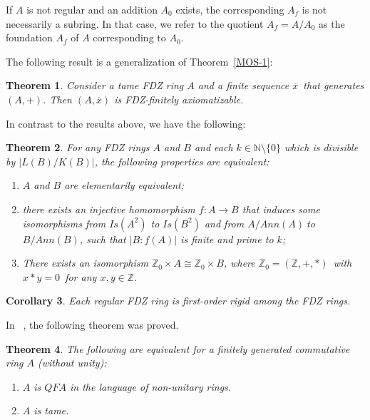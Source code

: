 \documentclass{article}
\newtheorem{theorem}{Theorem}[section]
\newtheorem{cor}[theorem]{Corollary}
\theoremstyle{remark}
\newcommand{\be}{\begin{enumerate}}
\newcommand{\ee}{\end{enumerate}}
\begin{document}
If $A$ is not regular and an addition $A_0$ exists, the corresponding $A_f$ is not necessarily a subring. In that case, we refer to the quotient $A_f=A/A_0$ as the foundation $A_f$ of $A$ corresponding to $A_0$.

The following result is a generalization of Theorem~\ref{MOS-1}:

\begin{theorem}\label{MOS-4} Consider a tame FDZ ring $A$ and a finite
sequence $\overline{x}$\ that generates $(A,+)$. Then $(A,\overline{x})$ is
FDZ-finitely axiomatizable.\end{theorem}

In contrast to the results above, we have the following:

\begin{theorem} For any FDZ rings $A$ and $B$ and each $k\in 
\mathbb{N}\setminus \{0\}
$ which is divisible by $\left| L(B)/K(B)\right| $, the following
properties are equivalent:
\be 
\item $A$ and $B$ are elementarily equivalent;

\item there exists an injective homomorphism $f:A\rightarrow B$ that
induces some isomorphisms from $Is(A^{2})$ to $Is(B^{2})$ and from $%
A/Ann(A)\ $to $B/Ann(B)$, such that $\left| B:f(A)\right| $ is finite
and prime to $k$;

\item There exists an isomorphism $%
\mathbb{Z}
_{0}\times A\cong 
\mathbb{Z}
_{0}\times B$, where $%
\mathbb{Z}
_{0}=(%
\mathbb{Z}
,+,\ast )$\ with $x\ast y=0$\ for any $x,y\in 
\mathbb{Z}
$.\ee
\end{theorem}
\begin{cor}\label{MOS-6} Each regular FDZ ring is first-order rigid among the FDZ rings. \end{cor}

In ~\cite{Rich}, the following theorem was proved.


\begin{theorem}\label{KMS-1}  The following are equivalent for a finitely generated commutative ring $A$ (without unity):
\begin{enumerate}
    \item $A$ is $QFA$ in the language of non-unitary rings.
    \item $A$ is tame.
\end{enumerate}
\end{theorem}
\end{document}
